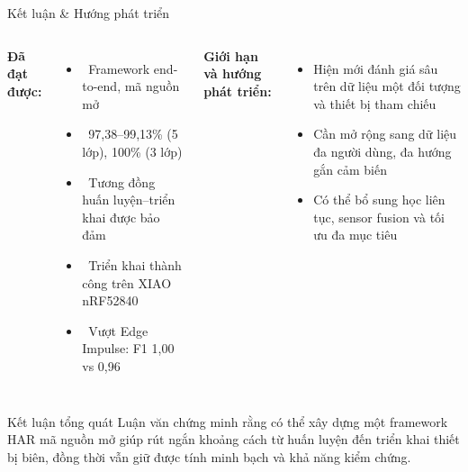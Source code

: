 \documentclass[aspectratio=169,12pt]{beamer}
\newcommand{\cmark}{\textcolor{green!60!black}{\ding{51}}}
\begin{document}
\begin{frame}{Kết luận \& Hướng phát triển}
  \begin{columns}[T]
      \textbf{Đã đạt được:}
      \begin{itemize}\small
        \item \cmark\ Framework end-to-end, mã nguồn mở
        \item \cmark\ 97,38--99,13\% (5 lớp), 100\% (3 lớp)
        \item \cmark\ Tương đồng huấn luyện--triển khai được bảo đảm
        \item \cmark\ Triển khai thành công trên XIAO nRF52840
        \item \cmark\ Vượt Edge Impulse: F1 1,00 vs 0,96
      \end{itemize}

      \textbf{Giới hạn và hướng phát triển:}
      \begin{itemize}\small
        \item Hiện mới đánh giá sâu trên dữ liệu một đối tượng và thiết bị tham chiếu
        \item Cần mở rộng sang dữ liệu đa người dùng, đa hướng gắn cảm biến
        \item Có thể bổ sung học liên tục, sensor fusion và tối ưu đa mục tiêu
      \end{itemize}
  \end{columns}

  \vspace{4pt}
  \begin{block}{\small Kết luận tổng quát}
    \small Luận văn chứng minh rằng có thể xây dựng một framework HAR mã nguồn mở giúp rút ngắn khoảng cách từ huấn luyện đến triển khai thiết bị biên, đồng thời vẫn giữ được tính minh bạch và khả năng kiểm chứng.
  \end{block}
\end{frame}
\end{document}
